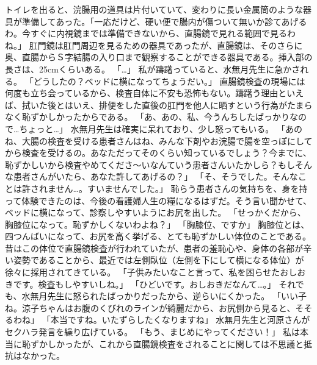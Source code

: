 トイレを出ると、浣腸用の道具は片付いていて、変わりに長い金属筒のような器具が準備してあった。「一応だけど、硬い便で腸内が傷ついて無いか診てあげるわ。今すぐに内視鏡までは準備できないから、直腸鏡で見れる範囲で見るわね。」
肛門鏡は肛門周辺を見るための器具であったが、直腸鏡は、そのさらに奥、直腸からＳ字結腸の入り口まで観察することができる器具である。挿入部の長さは、25cmくらいある。
「…」
私が躊躇っていると、水無月先生に急かされる。
「どうしたの？ベッドに横になってちょうだい。」
直腸鏡検査の現場には何度も立ち会っているから、検査自体に不安も恐怖もない。躊躇う理由といえば、拭いた後とはいえ、排便をした直後の肛門を他人に晒すという行為がたまらなく恥ずかしかったからである。
「あ、あの、私、今うんちしたばっかりなので…ちょっと…」
水無月先生は確実に呆れており、少し怒ってもいる。
「あのね、大腸の検査を受ける患者さんはね、みんな下剤やお浣腸で腸を空っぽにしてから検査を受けるの。あなただってそのくらい知っているでしょう？今までに、恥ずかしいから検査やめてくださ～いなんていう患者さんいたかしら？もしそんな患者さんがいたら、あなた許してあげるの？」
「そ、そうでした。そんなことは許されません…。すいませんでした。」
恥らう患者さんの気持ちを、身を持って体験できたのは、今後の看護婦人生の糧になるはずだ。そう言い聞かせて、ベッドに横になって、診察しやすいようにお尻を出した。
「せっかくだから、胸膝位になって。恥ずかしくないわよね？」
「胸膝位、ですか」
胸膝位とは、四つんばいになって、お尻を高く挙げる、とても恥ずかしい体位のことである。昔はこの体位で直腸鏡検査が行われていたが、患者の羞恥心や、身体の各部が辛い姿勢であることから、最近では左側臥位（左側を下にして横になる体位）が徐々に採用されてきている。
「子供みたいなこと言って、私を困らせたおしおきです。検査もしやすいしね。」
「ひどいです。おしおきだなんて…。」
それでも、水無月先生に怒られたばっかりだったから、逆らいにくかった。
「いい子ね。涼子ちゃんはお腹のくびれのラインが綺麗だから、お尻側から見ると、そそるわね」
「本当ですね。いたずらしたくなりますね」
水無月先生と河原さんがセクハラ発言を繰り広げている。
「もう、まじめにやってください！」
私は本当に恥ずかしかったが、これから直腸鏡検査をされることに関しては不思議と抵抗はなかった。

